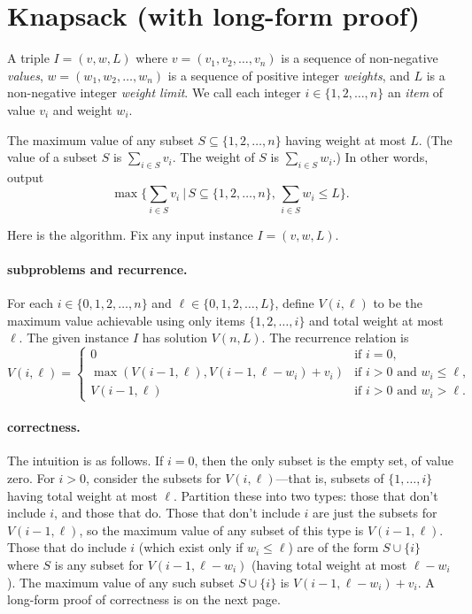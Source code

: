 
\section{Knapsack (with long-form proof)}\label{dp: sec: knapsack}

\begin{mylist}
\item[\bf input:]
  A triple $I=(v, w, L)$ where $v=(v_1,v_2,\ldots, v_n)$
  is a sequence of non-negative \emph{values}, 
  $w=(w_1,w_2,\ldots, w_n)$
  is a sequence of positive integer \emph{weights},
  and $L$ is a non-negative integer \emph{weight limit}.
  We call each integer $i\in \{1,2,\ldots,n\}$ an \emph{item}
  of value $v_i$ and weight $w_i$.
  
\item[\bf output:]
  The maximum value of any subset $S\subseteq \{1,2,\ldots,n\}$ 
  having weight at most $L$.
  (The value of a subset $S$ is $\sum_{i\in S} v_i$.
  The weight of $S$ is $\sum_{i\in S} w_i$.)
  In other words, output
  \[\textstyle \max\Big\{ \sum_{i\in S} v_i ~\big|\, S\subseteq \{1,2,\ldots, n\},\, \sum_{i\in S} w_i \le L\Big\}.\]
\end{mylist}


\noindent
Here is the algorithm.  Fix any input instance $I=(v,w,L)$.

\paragraph{subproblems and recurrence.}
For each $i\in\{0, 1,2,\ldots,n\}$ and $\ell\in\{0,1,2,\ldots,L\}$,
define $V(i, \ell)$
to be the maximum value achievable
using only items $\{1,2,\ldots,i\}$ and total weight at most $\ell$.
The given instance $I$ has solution $V(n, L)$.
The recurrence relation is
\[V(i,\ell) = \begin{cases}
    0 & \text{if } i=0, \\
    \max(  V(i-1, \ell), V(i-1, \ell-w_i) + v_i) &  \text{if } i > 0 \text{ and } w_i \le \ell, \\
    V(i-1, \ell) & \text{if } i > 0 \text{ and } w_i > \ell.
  \end{cases}
\]
\paragraph{correctness.}
The intuition is as follows.
If $i=0$, then the only subset is the empty set, of value zero.
For $i>0$, consider the subsets for $V(i, \ell)$---that is, subsets of $\{1,\ldots,i\}$ having total weight at most $\ell$.
Partition these into two types:
those that don't include $i$, and those that do.
Those that don't include $i$ are just the subsets for $V(i-1, \ell)$,
so the maximum value of any subset of this type is $V(i-1, \ell)$.
Those that do include $i$ (which exist only if $w_i \le \ell$)
are of the form $S\cup \{i\}$
where $S$ is any subset for $V(i-1, \ell-w_i)$
(having total weight at most $\ell-w_i$).
The maximum value of any such subset $S\cup\{i\}$ is $V(i-1, \ell-w_i) + v_i$.
A long-form proof of correctness is on the next page.

